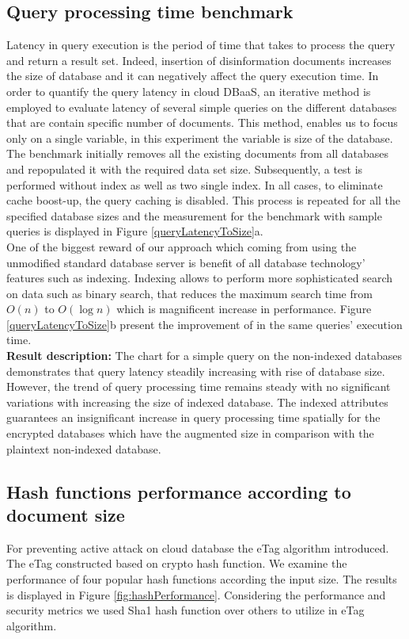 

\subsection{Query processing time benchmark}
Latency in query execution is the period of time that takes to process the query and return a result set. Indeed, insertion of disinformation documents increases the size of database and it can negatively affect the query execution time. In order to quantify the query latency in cloud DBaaS, an iterative method is employed to evaluate latency of several simple queries on the different databases that are contain specific number of documents. This method, enables us to focus only on a single variable, in this experiment the variable is size of the database. The benchmark initially removes all the existing documents from all databases and repopulated it with the required data set size. Subsequently, a test is performed without index as well as two single index. In all cases, to eliminate cache boost-up, the query caching is disabled. This process is repeated for all the specified database sizes and the measurement for the benchmark with sample queries is displayed in Figure \ref{queryLatencyToSize}a.\\ 

One of the biggest reward of our approach which coming from using the unmodified standard database server is benefit of all database technology’ features such as indexing. Indexing allows to perform more sophisticated search on data such as binary search, that reduces the maximum search time from $O(n)$ to $O(\log n)$ which is magnificent increase in performance. Figure \ref{queryLatencyToSize}b present the improvement of in the same queries' execution time.\\  

\textbf{Result description:} The chart for a simple query on the non-indexed databases demonstrates that query latency steadily increasing with rise of database size. However, the trend of query processing time remains steady with no significant variations with increasing the size of indexed database. The indexed attributes guarantees an insignificant increase in query processing time spatially for the encrypted databases which have the augmented size in comparison with the plaintext non-indexed database.




\subsection{Hash functions performance according to document size }
For preventing active attack on cloud database the eTag algorithm introduced. The eTag constructed based on crypto hash function. We examine the performance of four popular hash functions according the input size. The results is displayed in Figure \ref{fig:hashPerformance}. Considering the performance and security metrics we used Sha1 hash function over others to utilize in eTag algorithm.


